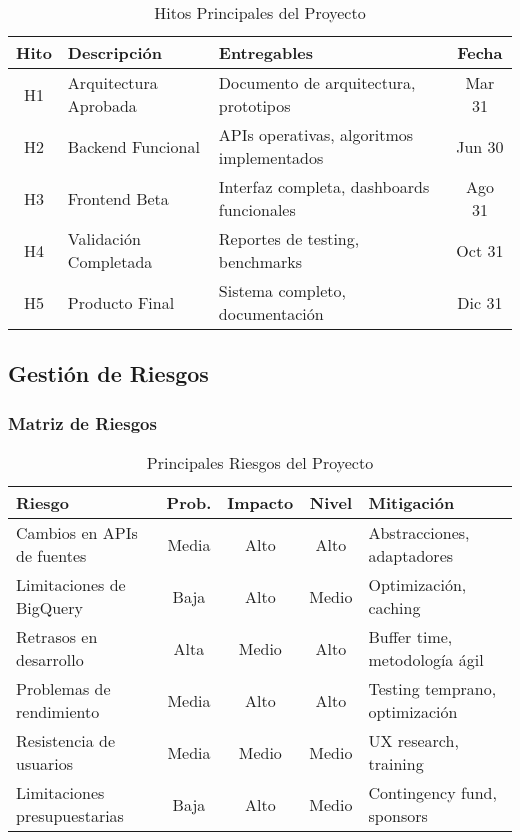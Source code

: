 \begin{table}[H]
    \centering
    \caption{Hitos Principales del Proyecto}
    \label{tab:hitos}
    \small
    \begin{tabular}{|c|l|l|c|}
        \hline
        \textbf{Hito} & \textbf{Descripción} & \textbf{Entregables} & \textbf{Fecha} \\
        \hline
        H1 & Arquitectura Aprobada & Documento de arquitectura, prototipos & Mar 31 \\
        \hline
        H2 & Backend Funcional & APIs operativas, algoritmos implementados & Jun 30 \\
        \hline
        H3 & Frontend Beta & Interfaz completa, dashboards funcionales & Ago 31 \\
        \hline
        H4 & Validación Completada & Reportes de testing, benchmarks & Oct 31 \\
        \hline
        H5 & Producto Final & Sistema completo, documentación & Dic 31 \\
        \hline
    \end{tabular}
\end{table}

\subsection{Gestión de Riesgos}

\subsubsection{Matriz de Riesgos}

\begin{table}[H]
    \centering
    \caption{Principales Riesgos del Proyecto}
    \label{tab:riesgos}
    \small
    \begin{tabular}{|l|c|c|c|l|}
        \hline
        \textbf{Riesgo} & \textbf{Prob.} & \textbf{Impacto} & \textbf{Nivel} & \textbf{Mitigación} \\
        \hline
        Cambios en APIs de fuentes & Media & Alto & Alto & Abstracciones, adaptadores \\
        \hline
        Limitaciones de BigQuery & Baja & Alto & Medio & Optimización, caching \\
        \hline
        Retrasos en desarrollo & Alta & Medio & Alto & Buffer time, metodología ágil \\
        \hline
        Problemas de rendimiento & Media & Alto & Alto & Testing temprano, optimización \\
        \hline
        Resistencia de usuarios & Media & Medio & Medio & UX research, training \\
        \hline
        Limitaciones presupuestarias & Baja & Alto & Medio & Contingency fund, sponsors \\
        \hline
    \end{tabular}
\end{table}

